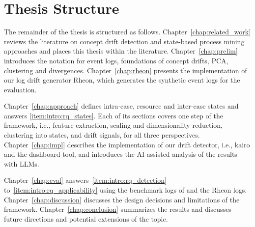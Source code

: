 \section{Thesis Structure}
\label{sec:intro_ssec:struct}
The remainder of the thesis is structured as follows. Chapter~\ref{chap:related_work} reviews the literature on concept drift detection and state-based process mining approaches and places this thesis within the literature. Chapter~\ref{chap:prelim} introduces the notation for event logs, foundations of concept drifts, PCA, clustering and divergences. Chapter~\ref{chap:rheon} presents the implementation of our log drift generator Rheon, which generates the synthetic event logs for the evaluation.

Chapter~\ref{chap:approach} defines intra-case, resource and inter-case states and answers \ref{item:intro:rq_states}. Each of its sections covers one step of the framework, i.e., feature extraction, scaling and dimensionality reduction, clustering into states, and drift signals, for all three perspectives. Chapter~\ref{chap:impl} describes the implementation of our drift detector, i.e., kairo and the dashboard tool, and introduces the AI-assisted analysis of the results with LLMs.

Chapter~\ref{chap:eval} answers~\ref{item:intro:rq_detection} to~\ref{item:intro:rq_applicability} using the benchmark logs of \textcite{padella2026everything} and the Rheon logs. Chapter~\ref{chap:discussion} discusses the design decisions and limitations of the framework. Chapter~\ref{chap:conclusion} summarizes the results and discusses future directions and potential extensions of the topic.

